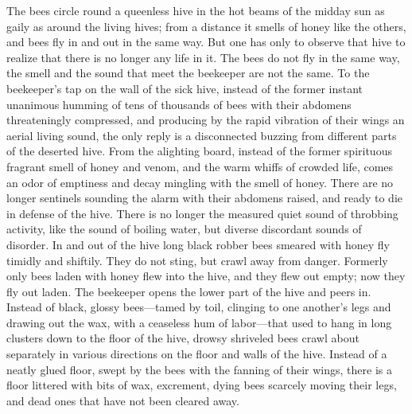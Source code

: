 The bees circle round a queenless hive in the hot beams of the
midday sun as gaily as around the living hives; from a distance
it smells of honey like the others, and bees fly in and out in
the same way. But one has only to observe that hive to realize
that there is no longer any life in it. The bees do not fly in
the same way, the smell and the sound that meet the beekeeper are
not the same. To the beekeeper's tap on the wall of the sick
hive, instead of the former instant unanimous humming of tens of
thousands of bees with their abdomens threateningly compressed,
and producing by the rapid vibration of their wings an aerial
living sound, the only reply is a disconnected buzzing from
different parts of the deserted hive. From the alighting board,
instead of the former spirituous fragrant smell of honey and
venom, and the warm whiffs of crowded life, comes an odor of
emptiness and decay mingling with the smell of honey. There are
no longer sentinels sounding the alarm with their abdomens
raised, and ready to die in defense of the hive. There is no
longer the measured quiet sound of throbbing activity, like the
sound of boiling water, but diverse discordant sounds of
disorder. In and out of the hive long black robber bees smeared
with honey fly timidly and shiftily. They do not sting, but crawl
away from danger. Formerly only bees laden with honey flew into
the hive, and they flew out empty; now they fly out laden. The
beekeeper opens the lower part of the hive and peers in. Instead
of black, glossy bees---tamed by toil, clinging to one another's
legs and drawing out the wax, with a ceaseless hum of
labor---that used to hang in long clusters down to the floor of
the hive, drowsy shriveled bees crawl about separately in various
directions on the floor and walls of the hive. Instead of a
neatly glued floor, swept by the bees with the fanning of their
wings, there is a floor littered with bits of wax, excrement,
dying bees scarcely moving their legs, and dead ones that have
not been cleared away.

